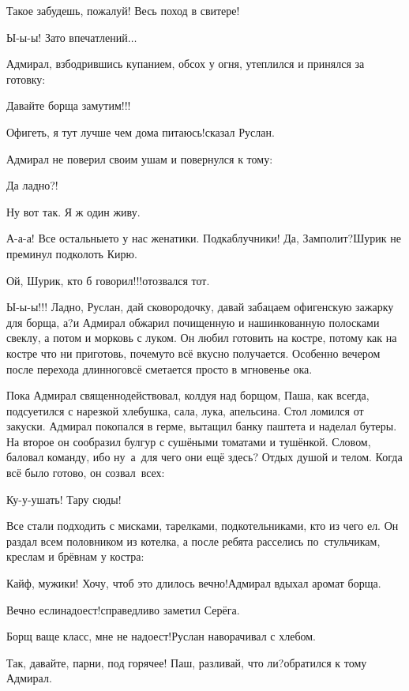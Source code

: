 \diagdash Такое забудешь, пожалуй! Весь поход в свитере!

\diagdash Ы-ы-ы! Зато впечатлений$\ldots$

Адмирал, взбодрившись купанием, обсох у огня, утеплился и принялся за готовку:

\diagdash Давайте борща замутим!!!

\diagdash Офигеть, я тут лучше чем дома питаюсь!\mdash сказал Руслан.

Адмирал не поверил своим ушам и повернулся к тому:

\diagdash Да ладно?!

\diagdash Ну вот так. Я ж один живу.

\diagdash А-а-а! Все остальные\sdash то у нас женатики. Подкаблучники! Да, Замполит?\mdash Шурик не преминул подколоть Кирю.

\diagdash Ой, Шурик, кто б говорил!!!\mdash отозвался тот.

\diagdash Ы-ы-ы!!! Ладно, Руслан, дай сковородочку, давай забацаем офигенскую зажарку для борща, а?\mdash и Адмирал обжарил почищенную и нашинкованную полосками свеклу, а потом и морковь с луком. Он любил готовить на костре, потому как на костре что ни приготовь, почему\sdash то всё вкусно получается. Особенно вечером после перехода длинного\mdash всё сметается просто в мгновенье ока.

Пока Адмирал священнодействовал, колдуя над борщом, Паша, как всегда, подсуетился с нарезкой хлебушка, сала, лука, апельсина. Стол ломился от закуски. Адмирал покопался в герме, вытащил банку паштета и наделал бутеры. На второе он сообразил булгур с сушёными томатами и тушёнкой. Словом, баловал команду, ибо ну~а~для чего они ещё здесь? Отдых душой и телом. Когда всё было готово, он созвал~всех:

\diagdash Ку-у-ушать! Тару сюды!

Все стали подходить с мисками, тарелками, подкотельниками, кто из чего ел. Он раздал всем половником из котелка, а после ребята расселись по~стульчикам, креслам и брёвнам у костра:

\diagdash Кайф, мужики! Хочу, чтоб это длилось вечно!\mdash Адмирал вдыхал аромат борща.

\diagdash Вечно если\mdash надоест!\mdash справедливо заметил Серёга.

\diagdash Борщ ваще класс, мне не надоест!\mdash Руслан наворачивал с хлебом.

\diagdash Так, давайте, парни, под горячее! Паш, разливай, что ли?\mdash обратился к тому Адмирал.

